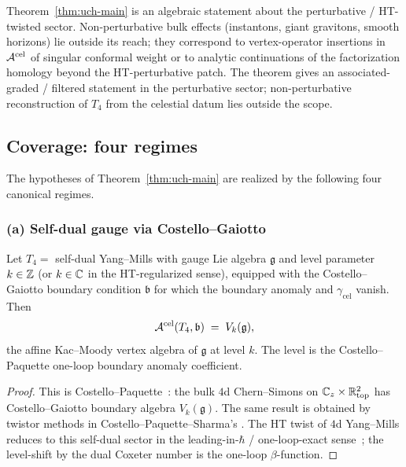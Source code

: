 \begin{remark}
\label{rem:uch-scope}
Theorem~\ref{thm:uch-main} is an algebraic statement about the
perturbative / HT-twisted sector. Non-perturbative bulk effects
(instantons, giant gravitons, smooth horizons) lie outside its reach;
they correspond to vertex-operator insertions in $\mathcal A^{\mathrm{cel}}$
of singular conformal weight or to analytic continuations of the
factorization homology beyond the HT-perturbative patch. The theorem
gives an associated-graded / filtered statement in the
perturbative sector; non-perturbative reconstruction of $T_4$ from the
celestial datum lies outside the scope.
\end{remark}

\subsection{Coverage: four regimes}
\label{subsec:uch-coverage}

The hypotheses of Theorem~\ref{thm:uch-main} are realized by the
following four canonical regimes.

\subsubsection*{(a) Self-dual gauge via Costello--Gaiotto}

\begin{proposition}
\label{prop:uch-sdgauge}
Let $T_4 = $ self-dual Yang--Mills with gauge Lie algebra $\mathfrak g$
and level parameter $k \in \mathbb Z$ (or $k \in \mathbb C$ in the
HT-regularized sense), equipped with the Costello--Gaiotto boundary
condition $\mathfrak b$ for which the boundary anomaly and
$\gamma_{\mathrm{cel}}$ vanish. Then
\[
\mathcal A^{\mathrm{cel}}(T_4,\mathfrak b) \;=\; V_k(\mathfrak g),
\]
the affine Kac--Moody vertex algebra of $\mathfrak g$ at level $k$.
The level is the Costello--Paquette one-loop boundary anomaly
coefficient.
\end{proposition}

\begin{proof}
This is Costello--Paquette~\cite[Thm.~1.1]{CostelloPaquetteTwistedSugraStates}:
the bulk $4$d Chern--Simons on $\mathbb C_z \times \mathbb R^2_{\text{top}}$ has
Costello--Gaiotto boundary algebra $V_k(\mathfrak g)$. The same result
is obtained by twistor methods in Costello--Paquette--Sharma's
\cite{CostelloPaquetteSharmaCelestial}. The HT twist of
$4$d Yang--Mills reduces to this self-dual sector in the
leading-in-$\hbar$ / one-loop-exact sense~\cite{CostelloLiSugraTwist};
the level-shift by the dual Coxeter number is the one-loop
$\beta$-function.
\end{proof}


